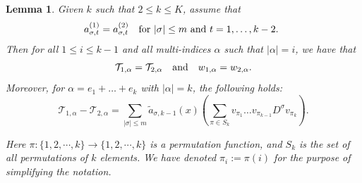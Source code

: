 \documentclass [oneside,11pt] {amsart}
\numberwithin{equation}{section}
\newtheorem{lemma}{Lemma}[section]
\newcommand{\LC}{\left(}
\newcommand{\RC}{\right)}
\begin{document}
\begin{lemma}\label{lemma:w the same}
Given $k$ such that $2\leq k\leq K$, assume that 
\begin{align}\label{hypothesis alpha}
a^{(1)}_{\sigma,t}=a^{(2)}_{\sigma, t} \quad\hbox{for $|\sigma|\leq m$ and $t=1,\ldots, k-2$. }
\end{align}
Then for all $1\leq i\leq k-1$ and all multi-indices $\alpha$ such that $|\alpha|= i$, we have that
\begin{align}\label{hypothesis w}
\mathcal{T}_{1,\alpha} =\mathcal{T}_{2,\alpha}\quad\hbox{and} \quad w_{1,\alpha} =w_{2,\alpha}.
\end{align}
Moreover, for $\alpha=e_{1}+\ldots+e_{k}$ with $|\alpha|=k$, the following holds:
$$
\mathcal{T}_{1,\alpha} -\mathcal{T}_{2,\alpha}= \sum_{|\sigma|\le m} \widetilde{a}_{\sigma, k-1}(x)\LC \sum_{\pi\in S_k} v_{\pi_1}\ldots v_{\pi_{k-1}}D^\sigma v_{\pi_k}\RC. 
$$

Here $\pi: \{1,2,\cdots,k\}\rightarrow \{1,2,\cdots,k\}$ is a permutation function, and $S_{k}$ is the set of all permutations of $k$ elements. We have denoted $\pi_i:=\pi(i)$ for the purpose of simplifying the notation. 

\end{lemma}
\end{document}
